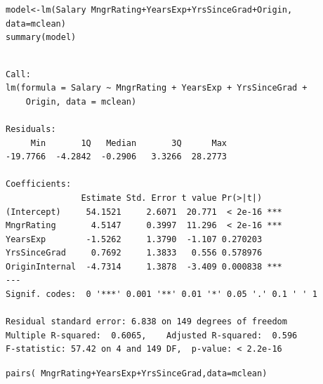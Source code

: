 \documentclass{beamer}\usepackage[]{graphicx}\usepackage[]{color}
\makeatletter
\newcommand{\hlopt}[1]{\textcolor[rgb]{1,0.894,0.769}{#1}}%
\newcommand{\hlstd}[1]{\textcolor[rgb]{1,0.894,0.769}{#1}}%
\newcommand{\hlkwb}[1]{\textcolor[rgb]{0.804,0.776,0.451}{#1}}%
\newcommand{\hlkwc}[1]{\textcolor[rgb]{0.78,0.941,0.545}{#1}}%
\newcommand{\hlkwd}[1]{\textcolor[rgb]{1,0.78,0.769}{#1}}%
\newenvironment{kframe}{%
 \def\at@end@of@kframe{}%
 \ifinner\ifhmode%
  \def\at@end@of@kframe{\end{minipage}}%
  \begin{minipage}{\columnwidth}%
 \fi\fi%
 \def\FrameCommand##1{\hskip\@totalleftmargin \hskip-\fboxsep
 \colorbox{shadecolor}{##1}\hskip-\fboxsep
     \hskip-\linewidth \hskip-\@totalleftmargin \hskip\columnwidth}%
 \MakeFramed {\advance\hsize-\width
   \@totalleftmargin\z@ \linewidth\hsize
   \@setminipage}}%
 {\par\unskip\endMakeFramed%
 \at@end@of@kframe}
\newenvironment{knitrout}{}{} %
\makeatother
\begin{document}
\begin{darkframes}
    \begin{frame}[fragile]%
      \fontsize{8}{8}\selectfont
\begin{knitrout}
\begin{kframe}
\begin{alltt}
\hlstd{model} \hlkwb{<-} \hlkwd{lm}\hlstd{(Salary} \hlopt{~} \hlstd{MngrRating} \hlopt{+} \hlstd{YearsExp} \hlopt{+} \hlstd{YrsSinceGrad} \hlopt{+} \hlstd{Origin,}
           \hlkwc{data}\hlstd{=mclean)}
\hlkwd{summary}\hlstd{(model)}
\end{alltt}
\begin{verbatim}

Call:
lm(formula = Salary ~ MngrRating + YearsExp + YrsSinceGrad + 
    Origin, data = mclean)

Residuals:
     Min       1Q   Median       3Q      Max 
-19.7766  -4.2842  -0.2906   3.3266  28.2773 

Coefficients:
               Estimate Std. Error t value Pr(>|t|)    
(Intercept)     54.1521     2.6071  20.771  < 2e-16 ***
MngrRating       4.5147     0.3997  11.296  < 2e-16 ***
YearsExp        -1.5262     1.3790  -1.107 0.270203    
YrsSinceGrad     0.7692     1.3833   0.556 0.578976    
OriginInternal  -4.7314     1.3878  -3.409 0.000838 ***
---
Signif. codes:  0 '***' 0.001 '**' 0.01 '*' 0.05 '.' 0.1 ' ' 1

Residual standard error: 6.838 on 149 degrees of freedom
Multiple R-squared:  0.6065,	Adjusted R-squared:  0.596 
F-statistic: 57.42 on 4 and 149 DF,  p-value: < 2.2e-16
\end{verbatim}
\end{kframe}
\end{knitrout}
    \end{frame}
    
    
    \begin{frame}[fragile]%
      \fontsize{9}{9}\selectfont
\begin{knitrout}
\begin{kframe}
\begin{alltt}
\hlkwd{pairs}\hlstd{(}\hlopt{~} \hlstd{MngrRating} \hlopt{+} \hlstd{YearsExp} \hlopt{+} \hlstd{YrsSinceGrad,} \hlkwc{data}\hlstd{=mclean)}
\end{alltt}
\end{kframe}



\end{knitrout}
\end{frame}
\end{darkframes}
\end{document}
